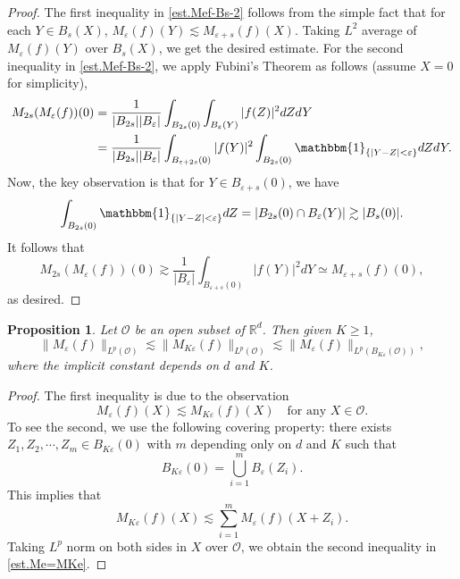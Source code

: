 \documentclass[reqno,12pt]{amsart} %
\newtheorem{proposition}[theorem]{Proposition}
\theoremstyle{definition}
\theoremstyle{remark}
\numberwithin{equation}{section}
\newcommand{\R}{\mathbb{R}}
\newcommand{\e}{\varepsilon}
\begin{document}
\begin{proof}
    The first inequality in \eqref{est.Mef-Bs-2} follows from the simple fact that for each $Y \in B_s(X)$, $M_\e(f)(Y) \lesssim M_{\e+s}(f)(X)$. Taking $L^2$ average of $M_\e(f)(Y)$ over $B_s(X)$, we get the desired estimate. For the second inequality in \eqref{est.Mef-Bs-2}, we apply Fubini's Theorem as follows (assume $X = 0$ for simplicity),
    \begin{equation}
        \begin{aligned}
            M_{2s}(M_\e(f))(0) & = \frac{1}{|B_{2s}| |B_\e|} \int_{B_{2s}(0)} \int_{B_\e(Y)} |f(Z)|^2 dZ dY \\
            & = \frac{1}{|B_{2s}| |B_\e|} \int_{B_{\e+2s}(0)} |f(Y)|^2 \int_{B_{2s}(0)} \mathbbm{1}_{\{ |Y-Z|<\e \} } dZ dY.
        \end{aligned}
    \end{equation}
    Now, the key observation is that for $Y \in B_{\e+s}(0)$, we have
    \begin{equation}
        \int_{B_{2s}(0)} \mathbbm{1}_{\{ |Y-Z|<\e \} } dZ= | B_{2s}(0) \cap B_\e(Y) | \gtrsim |B_s(0)|.
    \end{equation}
    It follows that
    \begin{equation}
        M_{2s}(M_\e(f))(0) \gtrsim \frac{1}{|B_\e|} \int_{B_{\e+s}(0)} |f(Y)|^2 dY \simeq M_{\e+s}(f)(0),
    \end{equation}
    as desired.
\end{proof}

\begin{proposition}\label{prop.Me=MKe}
    Let $\mathcal{O}$ be an open subset of $\R^d$. Then given $K \ge 1$, 
    \begin{equation}\label{est.Me=MKe}
        \| M_\e(f) \|_{L^p(\mathcal{O})} \lesssim \| M_{K\e}(f) \|_{L^p(\mathcal{O})} \lesssim \| M_{\e}(f) \|_{L^p(B_{K\e}(\mathcal{O}))},
    \end{equation}
    where the implicit constant depends on $d$ and $K$.
\end{proposition}
\begin{proof}
    The first inequality is due to the observation
    \begin{equation}
        M_\e(f)(X) \lesssim M_{K\e}(f)(X) \quad \text{for any } X\in \mathcal{O}.
    \end{equation}
    To see the second, we use the following covering property: there exists $Z_1,Z_2,\cdots, Z_m \in B_{K\e}(0)$ with $m$ depending only on $d$ and $K$ such that
    \begin{equation}
        B_{K\e}(0) = \bigcup_{i=1}^m B_\e(Z_i).
    \end{equation}
    This implies that
    \begin{equation}
        M_{K\e}(f)(X) \lesssim \sum_{i=1}^m M_\e(f)(X+Z_i).
    \end{equation}
    Taking $L^p$ norm on both sides in $X$ over $\mathcal{O}$, we obtain the second inequality in \eqref{est.Me=MKe}.
\end{proof}
\end{document}
